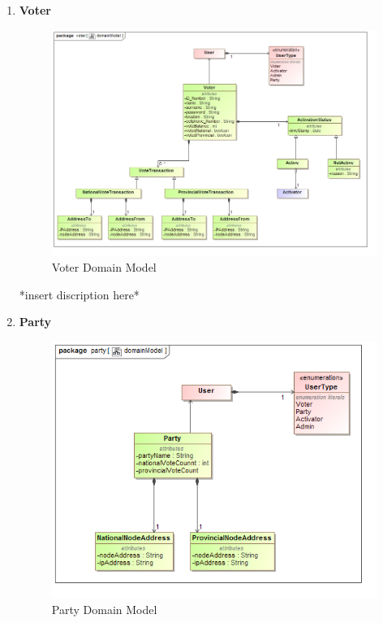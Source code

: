 \begin{enumerate}
		\item \textbf{Voter}
			\begin{figure}[H]
				\centering
				\includegraphics[width=0.75\linewidth]{../Images/DomainModels/voter_domainModel.png}
				\caption{Voter Domain Model}
			\end{figure}
			
			*insert discription here*
			\newline
			\item \textbf{Party}
			\begin{figure}[H]
				\centering
				\includegraphics[width=0.75\linewidth]{../Images/DomainModels/party_domainModel.png}
				\caption{Party Domain Model}
			\end{figure}
			

\end{enumerate}
